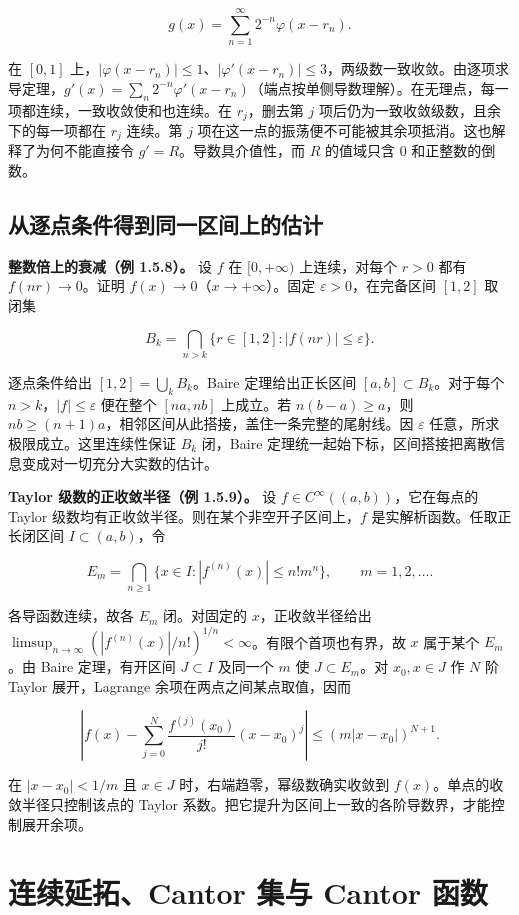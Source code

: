 \documentclass[11pt,a4paper]{article}
\begin{document}
\[
g(x)=\sum_{n=1}^{\infty}2^{-n}\varphi(x-r_n).
\]

在 \([0,1]\) 上，\(|\varphi(x-r_n)|\le 1\)、\(|\varphi'(x-r_n)|\le 3\)，两级数一致收敛。由逐项求导定理，\(g'(x)=\sum_n2^{-n}\varphi'(x-r_n)\)（端点按单侧导数理解）。在无理点，每一项都连续，一致收敛使和也连续。在 \(r_j\)，删去第 \(j\) 项后仍为一致收敛级数，且余下的每一项都在 \(r_j\) 连续。第 \(j\) 项在这一点的振荡便不可能被其余项抵消。这也解释了为何不能直接令 \(g'=R\)。导数具介值性，而 \(R\) 的值域只含 \(0\) 和正整数的倒数。

\subsection{从逐点条件得到同一区间上的估计}

\textbf{整数倍上的衰减（例 1.5.8）。} 设 \(f\) 在 \([0,+\infty)\) 上连续，对每个 \(r>0\) 都有 \(f(nr)\to0\)。证明 \(f(x)\to0\)（\(x\to+\infty\)）。固定 \(\varepsilon>0\)，在完备区间 \([1,2]\) 取闭集

\[
B_k=\bigcap_{n>k}\{r\in[1,2]:|f(nr)|\le\varepsilon\}.
\]

逐点条件给出 \([1,2]=\bigcup_kB_k\)。Baire 定理给出正长区间 \([a,b]\subset B_k\)。对于每个 \(n>k\)，\(|f|\le\varepsilon\) 便在整个 \([na,nb]\) 上成立。若 \(n(b-a)\ge a\)，则 \(nb\ge(n+1)a\)，相邻区间从此搭接，盖住一条完整的尾射线。因 \(\varepsilon\) 任意，所求极限成立。这里连续性保证 \(B_k\) 闭，Baire 定理统一起始下标，区间搭接把离散信息变成对一切充分大实数的估计。

\textbf{Taylor 级数的正收敛半径（例 1.5.9）。} 设 \(f\in C^\infty((a,b))\)，它在每点的 Taylor 级数均有正收敛半径。则在某个非空开子区间上，\(f\) 是实解析函数。任取正长闭区间 \(I\subset(a,b)\)，令

\[
E_m=\bigcap_{n\ge1}\{x\in I:|f^{(n)}(x)|\le n!m^n\},
\qquad m=1,2,\ldots .
\]

各导函数连续，故各 \(E_m\) 闭。对固定的 \(x\)，正收敛半径给出 \(\limsup_{n\to\infty}(|f^{(n)}(x)|/n!)^{1/n}<\infty\)。有限个首项也有界，故 \(x\) 属于某个 \(E_m\)。由 Baire 定理，有开区间 \(J\subset I\) 及同一个 \(m\) 使 \(J\subset E_m\)。对 \(x_0,x\in J\) 作 \(N\) 阶 Taylor 展开，Lagrange 余项在两点之间某点取值，因而

\[
\left|f(x)-\sum_{j=0}^{N}\frac{f^{(j)}(x_0)}{j!}(x-x_0)^j\right|
\le (m|x-x_0|)^{N+1}.
\]

在 \(|x-x_0|<1/m\) 且 \(x\in J\) 时，右端趋零，幂级数确实收敛到 \(f(x)\)。单点的收敛半径只控制该点的 Taylor 系数。把它提升为区间上一致的各阶导数界，才能控制展开余项。
\section{连续延拓、Cantor 集与 Cantor 函数}
\end{document}

